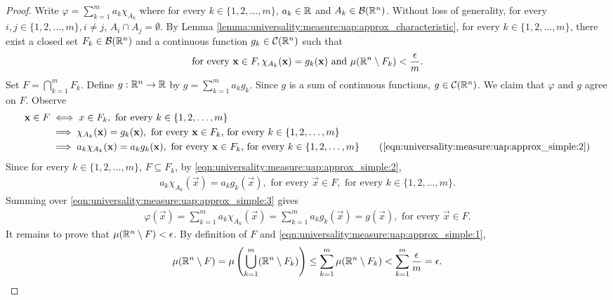 \begin{proof}
Write $\varphi = \sum_{k = 1}^m a_k \chi_{A_{k}}$ where for every $k \in \{ 1, 2, \ldots, m \}$,
$a_k \in {\mathbb R}$ and $A_k \in {\mathcal B}({\mathbb R}^n)$. Without loss of generality, for every $i, j \in  \{ 1, 2, \ldots, m \}, i \neq j$, $A_i \cap A_j = \emptyset$.
By Lemma \ref{lemma:universality:measure:uap:approx_characteristic}, for every $k \in \{ 1, 2, \ldots, m \}$, there exist a closed set $F_k \in {\mathcal B}({\mathbb R}^n)$ and a continuous function $g_k \in {\mathcal C}({\mathbb R}^n)$ such that
\begin{align}
    \label{eqn:universality:measure:uap:approx_simple:1}
    \text{for every } \mathbf{x} \in F, \chi_{A_k} (\mathbf{x}) = g_k (\mathbf{x}) \text{ and } \mu ({\mathbb R}^n \setminus F_k) < \frac{\epsilon}{m}.
\end{align}
Set $F = \bigcap_{k=1}^m F_k$. Define $g : {\mathbb R}^n \to {\mathbb R}$ by $g = \sum_{k = 1}^m a_k g_k$. Since $g$ is a sum of continuous functions, $g \in {\mathcal C}({\mathbb R}^n)$. We claim that $\varphi$ and $g$ agree on $F$. Observe
\begin{subequations}\label{eqn:universality:measure:uap:approx_simple:2}
\begin{align*}
    \vec{x} \in F &\iff x \in F_k, \text{ for every $k \in \{ 1, 2, \ldots, m \} $} \\
                  &\implies \chi_{A_{k}}(\vec{x}) = g_k(\vec{x}), \text{ for every $\vec{x} \in F_k$, } \text{for every $k \in \{ 1, 2, \ldots, m \} $} \\ 
                  &\implies a_k  \chi_{A_{k}}(\vec{x}) = a_k g_k(\vec{x}),  \text{ for every $\vec{x} \in F_k$, } \text{for every $k \in \{ 1, 2, \ldots, m \} $}
     \tag{\ref{eqn:universality:measure:uap:approx_simple:2}}
\end{align*}
\end{subequations}
Since for every $k \in \{ 1, 2, \ldots, m \} $, $F \subseteq F_k$, by \ref{eqn:universality:measure:uap:approx_simple:2}, \begin{align}
    \label{eqn:universality:measure:uap:approx_simple:3}
     a_k  \chi_{A_{k}}(\vec{x}) = a_k g_k(\vec{x}), \text{ for every $\vec{x} \in F$}, \text{ for every $k \in \{ 1, 2, \ldots, m \} $}.
\end{align}
Summing over \ref{eqn:universality:measure:uap:approx_simple:3} gives \begin{align}
    \varphi(\vec{x}) = \sum_{k = 1}^m a_k \chi_{A_{k}}(\vec{x}) =  \sum_{k = 1}^m a_k g_k(\vec{x}) = g(\vec{x}), \text{ for every $\vec{x} \in F$.}
\end{align}
It remains to prove that $\mu({\mathbb R}^n \setminus F) < \epsilon$. By definition of $F$ and \ref{eqn:universality:measure:uap:approx_simple:1}, \begin{align}
    \mu({\mathbb R}^n \setminus F) = \mu \left (\bigcup_{k=1}^m ({\mathbb R}^n \setminus F_k) \right) \leq \sum_{k = 1}^m \mu ({\mathbb R}^n \setminus F_k) < \sum_{k = 1}^m \frac{\epsilon}{m} = \epsilon.
\end{align}
\end{proof}
